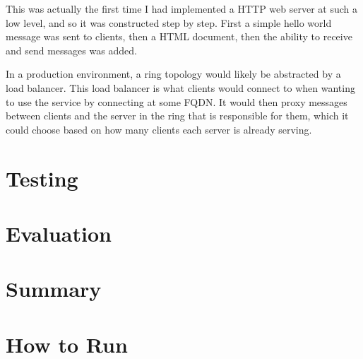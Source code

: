 \documentclass[12pt]{article}
\begin{document}
This was actually the first time I had implemented a HTTP web server at such a low level, and so it was constructed step by step. First a simple hello world message was sent to clients, then a HTML document, then the ability to receive and send messages was added.

In a production environment, a ring topology would likely be abstracted by a load balancer. This load balancer is what clients would connect to when wanting to use the service by connecting at some FQDN. It would then proxy messages between clients and the server in the ring that is responsible for them, which it could choose based on how many clients each server is already serving. 

\section{Testing}

\section{Evaluation}

\section{Summary}

\section{How to Run}



\end{document}
